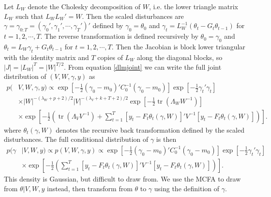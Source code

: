 \documentclass{article}
\DeclareMathOperator{\tr}{tr}
\begin{document}
Let $L_W$ denote the Cholesky decomposition of $W$, i.e. the lower triangle matrix $L_W$ such that $L_WL_W' =W$. Then the scaled disturbances are $\gamma=\gamma_{0:T}=(\gamma_0',\gamma_1',\cdots,\gamma_T')'$ defined by $\gamma_0=\theta_0$ and $\gamma_t = L_W^{-1}(\theta_t-G_t\theta_{t-1})$ for $t=1,2,\cdots,T$. The reverse transformation is defined recursively by $\theta_0=\gamma_0$ and $\theta_t=L_W\gamma_t + G_t\theta_{t-1}$ for $t=1,2,\cdots,T$. Then the Jacobian is block lower triangular with the identity matrix and $T$ copies of $L_W$ along the diagonal blocks, so $|J| = |L_W|^T=|W|^{T/2}$. From equation \eqref{dlmjoint} we can write the full joint distribution of $(V,W,\gamma,y)$ as
 \begin{align}
  p(&V,W,\gamma,y) \propto \exp\left[-\frac{1}{2}(\gamma_0-m_0)'C_0^{-1}(\gamma_0-m_0)\right] \exp\left[-\frac{1}{2}\gamma_t'\gamma_t\right] \nonumber\\
  &\times |W|^{-(\lambda_W + p + 2)/2} |V|^{-(\lambda_V + k + T + 2)/2} \exp\left[-\frac{1}{2}\tr\left(\Lambda_WW^{-1}\right)\right]  \nonumber\\
  &\times \exp\left[-\frac{1}{2}\left(\tr\left(\Lambda_VV^{-1}\right) + \sum_{t=1}^T\left[y_t-F_t\theta_t(\gamma,W)\right]'V^{-1}\left[y_t-F_t\theta_t(\gamma,W)\right]\right)\right]\label{dlmdistjoint}. 
 \end{align}
where $\theta_t(\gamma,W)$ denotes the recursive back transformation defined by the scaled disturbances. The full conditional distribution of $\gamma$ is then
\begin{align*}
  p(\gamma&|V,W,y) \propto p(V,W,\gamma,y) \propto \exp\left[-\frac{1}{2}(\gamma_0-m_0)'C_0^{-1}(\gamma_0-m_0)\right] \exp\left[-\frac{1}{2}\gamma_t'\gamma_t\right]\\
&\times \exp\left[-\frac{1}{2}\left(\sum_{t=1}^T\left[y_t-F_t\theta_t(\gamma,W)\right]'V^{-1}\left[y_t-F_t\theta_t(\gamma,W)\right]\right)\right]. 
\end{align*}
This density is Gaussian, but difficult to draw from. We use the MCFA to draw from $\theta|V,W,y$ instead, then transform from $\theta$ to $\gamma$ using the definition of $\gamma$.
\end{document}
